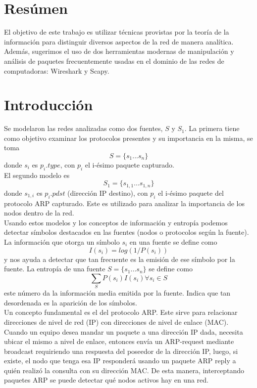 \section{Resúmen}

El objetivo de este trabajo es utilizar técnicas provistas por la teoría de la información para distinguir diversos aspectos de la red de manera analítica. Además, sugerimos el uso de dos herramientas modernas de manipulación y análisis de paquetes frecuentemente usadas en el dominio de las redes de computadoras: Wireshark y Scapy.

\section{Introducción}
Se modelaron las redes analizadas como dos fuentes, $S$ y $S_1$. La primera tiene como objetivo examinar los protocolos presentes y su importancia en la misma, se toma 
						$$S = \{s_1...s_n\}$$
donde $s_i$ es $p_i.type$, con $p_i$ el i-ésimo paquete capturado.
\\
El segundo modelo es 
						$$S_1 = \{s_{1,1}...s_{1,n}\}$$
donde $s_{1,i}$ es $p_i.pdst$ (dirección IP destino), con $p_i$ el i-ésimo paquete del protocolo ARP capturado. Este es utilizado para analizar la importancia de los nodos dentro de la red. 
\\
	Usando estos modelos y los conceptos de información y entropía podemos detectar símbolos destacados en las fuentes (nodos o protocolos según la fuente). La información que otorga un símbolo $s_i$ en una fuente se define como 
								$$ I (s_i) = log(1/P(s_i)) $$
y nos ayuda a detectar que tan frecuente es la emisión de ese símbolo por la fuente.
La entropía de una fuente $S = \{s_1...s_n\}$ se define como
								$$\sum_{S} P(s_i)I(s_i) \forall{s_i} \in{S}$$
este número da la información media emitida por la fuente. Indica que tan desordenada es la aparición de los símbolos.
\\

Un concepto fundamental es el del protocolo ARP. Este sirve para relacionar direcciones de nivel de red (IP) con direcciones de nivel de enlace (MAC). Cuando un equipo desea mandar un paquete a una dirección IP dada, necesita ubicar el mismo a nivel de enlace, entonces envía un ARP-request mediante broadcast requiriendo una respuesta del poseedor de la dirección IP, luego, si existe, el nodo que tenga esa IP responderá usando un paquete ARP reply a quién realizó la consulta con su dirección MAC. De esta manera, interceptando paquetes ARP se puede detectar qué nodos activos hay en una red. 		

